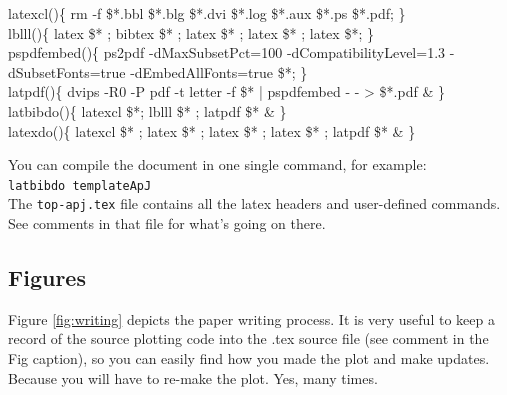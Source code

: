\footnotesize \noindent
latexcl()\{ rm -f \$*.bbl \$*.blg \$*.dvi \$*.log \$*.aux \$*.ps \$*.pdf; \} \\
lblll()\{ latex \$* ; bibtex \$* ; latex \$* ; latex \$* ; latex \$*; \} \\
pspdfembed()\{ ps2pdf -dMaxSubsetPct=100 -dCompatibilityLevel=1.3 -dSubsetFonts=true -dEmbedAllFonts=true \$*; \} \\
latpdf()\{ dvips -R0 -P pdf -t letter -f \$* | pspdfembed - - > \$*.pdf \& \} \\
latbibdo()\{ latexcl \$*; lblll \$* ; latpdf \$* \& \} \\
latexdo()\{ latexcl \$* ; latex \$* ; latex \$* ; latex \$* ; latpdf \$* \& \} \\
\normalsize


You can compile the document in one single command, for example: \\
{\tt latbibdo templateApJ} \\

The {\tt top-apj.tex} file contains all the latex headers and
user-defined commands.  See comments in that file for what's going on
there.

\subsection{Figures}
\label{sec:figures}

Figure \ref{fig:writing} depicts the paper writing process.  It is
very useful to keep a record of the source plotting code into the .tex
source file (see comment in the Fig caption), so you can
easily find how you made the plot and make updates.  Because you will
have to re-make the plot. Yes, many times.

